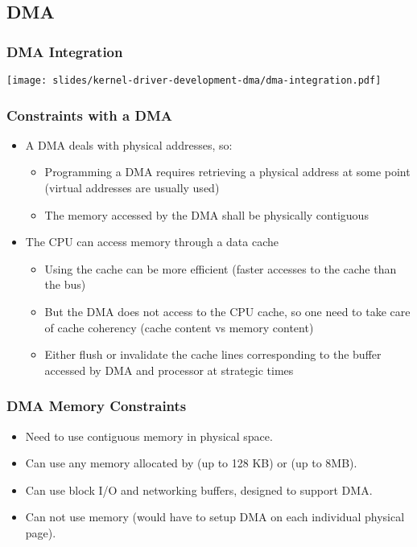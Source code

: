 \subsection{DMA}

\begin{frame}
  \frametitle{DMA Integration}
  \begin{center}
    \texttt{[image: slides/kernel-driver-development-dma/dma-integration.pdf]}
  \end{center}
\end{frame}

\begin{frame}
  \frametitle{Constraints with a DMA}
  \begin{itemize}
  \item A DMA deals with physical addresses, so:
    \begin{itemize}
    \item Programming a DMA requires retrieving a physical address at
      some point (virtual addresses are usually used)
    \item The memory accessed by the DMA shall be physically
      contiguous
    \end{itemize}
  \item The CPU can access memory through a data cache
    \begin{itemize}
    \item Using the cache can be more efficient (faster accesses to
      the cache than the bus)
    \item But the DMA does not access to the CPU cache, so one need to
      take care of cache coherency (cache content vs memory content)
    \item Either flush or invalidate the cache lines corresponding to
      the buffer accessed by DMA and processor at strategic times
    \end{itemize}
  \end{itemize}
\end{frame}

\begin{frame}
  \frametitle{DMA Memory Constraints}
  \begin{itemize}
  \item Need to use contiguous memory in physical space.
  \item Can use any memory allocated by  (up to 128 KB)
    or  (up to 8MB).
  \item Can use block I/O and networking buffers, designed to support
    DMA.
  \item Can not use  memory (would have to setup DMA on each
    individual physical page).
  \end{itemize}
\end{frame}


